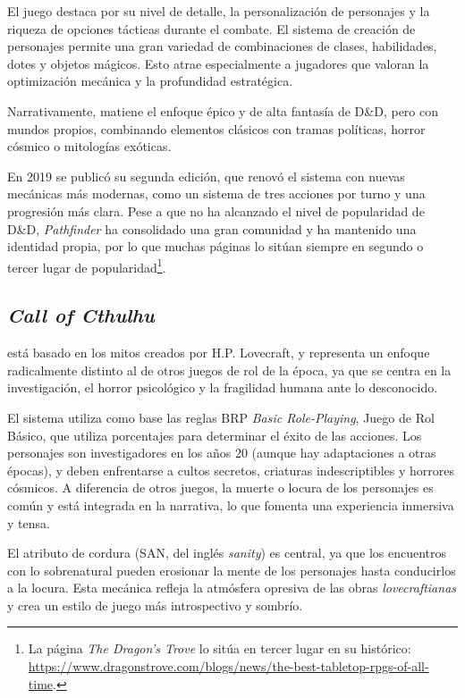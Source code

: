 \medskip

El juego destaca por su nivel de detalle, la personalización de personajes y la riqueza de opciones tácticas durante el combate. El sistema de creación de personajes permite una gran variedad de combinaciones de clases, habilidades, dotes y objetos mágicos. Esto atrae especialmente a jugadores que valoran la optimización mecánica y la profundidad estratégica.

\medskip

Narrativamente, matiene el enfoque épico y de alta fantasía de D\&D, pero con mundos propios, combinando elementos clásicos con tramas políticas, horror cósmico o mitologías exóticas.

\smallskip

En 2019 se publicó su segunda edición, que renovó el sistema con nuevas mecánicas más modernas, como un sistema de tres acciones por turno y una progresión más clara. Pese a que no ha alcanzado el nivel de popularidad de D\&D, \textit{Pathfinder} ha consolidado una gran comunidad y ha mantenido una identidad propia, por lo que muchas páginas lo sitúan siempre en segundo o tercer lugar de popularidad\footnote{La página \textit{The Dragon's Trove} lo sitúa en tercer lugar en su histórico: \url{https://www.dragonstrove.com/blogs/news/the-best-tabletop-rpgs-of-all-time}.}.

\subsection{\textit{Call of Cthulhu}}
\cite{cthulhu} está basado en los mitos creados por H.P. Lovecraft, y representa un enfoque radicalmente distinto al de otros juegos de rol de la época, ya que se centra en la investigación, el horror psicológico y la fragilidad humana ante lo desconocido.

\medskip

El sistema utiliza como base las reglas BRP {\textit{Basic Role-Playing}, Juego de Rol Básico}, que utiliza porcentajes para determinar el éxito de las acciones. Los personajes son investigadores en los años 20 (aunque hay adaptaciones a otras épocas), y deben enfrentarse a cultos secretos, criaturas indescriptibles y horrores cósmicos. A diferencia de otros juegos, la muerte o locura de los personajes es común y está integrada en la narrativa, lo que fomenta una experiencia inmersiva y tensa.

\medskip

El atributo de cordura (SAN, del inglés \textit{sanity}) es central, ya que los encuentros con lo sobrenatural pueden erosionar la mente de los personajes hasta conducirlos a la locura. Esta mecánica refleja la atmósfera opresiva de las obras \textit{lovecraftianas} y crea un estilo de juego más introspectivo y sombrío.

